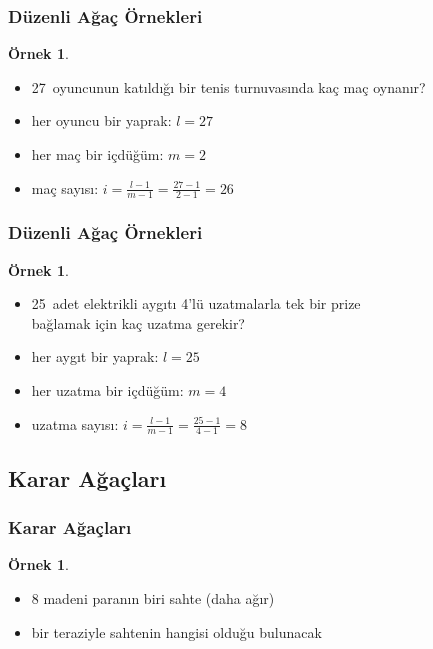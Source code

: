 \documentclass[dvipsnames]{beamer}
\theoremstyle{definition}
\theoremstyle{example}
\newtheorem{ornek}[theorem]{Örnek}
\theoremstyle{plain}
\begin{document}
\begin{frame}
  \frametitle{Düzenli Ağaç Örnekleri}

  \begin{ornek}
    \begin{itemize}
      \item 27~oyuncunun katıldığı bir tenis turnuvasında kaç maç oynanır?

      \pause
      \bigskip
      \item her oyuncu bir yaprak: $l = 27$
      \item her maç bir içdüğüm: $m = 2$
      \item maç sayısı: $i = \frac{l - 1}{m - 1} = \frac{27 - 1}{2 - 1} = 26$
    \end{itemize}
  \end{ornek}
\end{frame}

\begin{frame}
  \frametitle{Düzenli Ağaç Örnekleri}

  \begin{ornek}
    \begin{itemize}
      \item 25~adet elektrikli aygıtı 4'lü uzatmalarla tek bir prize\\
        bağlamak için kaç uzatma gerekir?

      \pause
      \bigskip
      \item her aygıt bir yaprak: $l = 25$
      \item her uzatma bir içdüğüm: $m = 4$
      \item uzatma sayısı: $i = \frac{l - 1}{m - 1} = \frac{25 - 1}{4 - 1} = 8$
    \end{itemize}
  \end{ornek}
\end{frame}

\subsection{Karar Ağaçları}

\begin{frame}
  \frametitle{Karar Ağaçları}

  \begin{ornek}
    \begin{itemize}
      \item 8 madeni paranın biri sahte (daha ağır)
      \item bir teraziyle sahtenin hangisi olduğu bulunacak
    \end{itemize}
  \end{ornek}
\end{frame}
\end{document}
